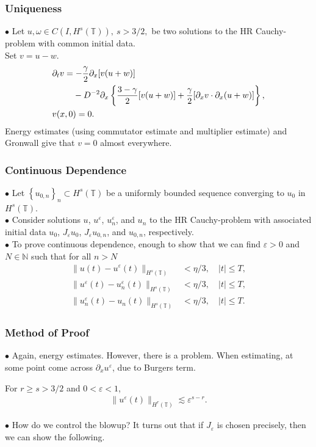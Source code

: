 \documentclass{beamer}
\newcommand{\p}{\partial}
\newcommand{\ci}{\mathbb{T}}
\newcommand{\ee}{\varepsilon}
\begin{document}
\begin{frame}
	\frametitle{Uniqueness}
%
%
$\bullet$ Let $u,\omega \in C(I, H^s(\ci)), \ s>3/2,$ be two solutions to the HR
Cauchy-problem with
common initial data. \\
\pause
Set $v=u-w$.
%
%
\begin{align*}
& \p_t v
=  -\frac{\gamma}{2} \p_x [v(u + w)] 
\\
\notag
& \phantom{\p_t v = }- D^{-2} \p_x \left\{
\frac{3-\gamma}{2}[v(u+w)] + \frac{\gamma}{2}[\p_x v \cdot \p_x (u+w)]
\right\},
\\
& v(x,0) = 0.
\end{align*}
%
%
\pause
Energy estimates (using commutator estimate and multiplier estimate) and Gronwall give that $v=0$ almost everywhere.
%
%
%
%
\end{frame}
\begin{frame}
  \frametitle{Continuous Dependence}
$\bullet$
Let $\left\{ u_{0, n} \right\}_n \subset H^s(\ci)$ be a uniformly bounded
sequence converging to $u_0$ in $H^s(\ci)$.
\\
\pause $\bullet$ 
Consider solutions $u $, $u^\ee$, $u^\ee_n$, and $u_n$ to the 
HR Cauchy-problem
with associated initial data $u_0$, $J_\ee u_0$,
$J_\ee u_{0,n}$, and $u_{0,n}$, respectively. 
\\
\pause $\bullet$
To prove continuous dependence, enough to show that 
we can find $\ee > 0$ and $N \in \mathbb{N}$ such that for all $n > N$ 
\begin{align*}
	 \|u(t) - u^\ee(t)\|_{H^s(\ci)}
	& < \eta/3, \quad |t| \le T,
\\
  \|u^\ee(t) - u^{\ee}_n(t)
\|_{H^s(\ci)} & < \eta/3, \quad |t| \le T,
\\
  \|u^{\ee}_n(t) - u_n(t) \|_{H^s(\ci)} & < \eta/3, \quad |t| \le T.
\end{align*}
%
%
\end{frame}
\begin{frame}
  \frametitle{Method of Proof}
  $\bullet$ Again, energy estimates. However, there is a problem. When estimating, at some point come across $\p_{x} u^{\ee}$, due to Burgers term.
\begin{lemma}
For $r \ge s > 3/2$ and $0 < \ee <1$, 
%
%
\begin{equation*}
\begin{split}
\|u^{\ee} (t) \|_{H^r(\ci)} \lesssim \ee^{s-r}.
\end{split}
\end{equation*}
%
%
\end{lemma}
\pause $\bullet$ How do we control the blowup? It turns out that if $J_{\ee}$ is chosen precisely, then we can show the following.
\end{frame}
\end{document}
